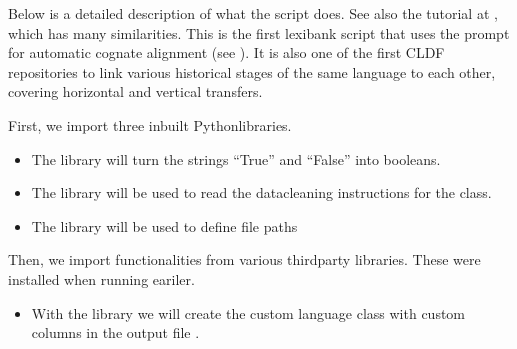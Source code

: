 \documentclass[letterpaper,10pt,english]{sphinxmanual}
\begin{document}
{{{{\sphinxAtStartPar
Below is a detailed description of what the script does. See also the
tutorial at , which has many similarities.
This is the first lexibank script that uses the
 prompt for automatic cognate alignment
(see ).
It is also one of the first CLDF repositories to link various historical
stages of the same language to each other, covering horizontal and vertical
transfers.

\begin{sphinxVerbatim}[commandchars=\\\{\}]
 
 
 

 
   
   
       
\end{sphinxVerbatim}

\sphinxAtStartPar
First, we import three inbuilt Python\sphinxhyphen{}libraries.
\begin{itemize}
\item {} 
\sphinxAtStartPar
The  library will turn
the strings “True” and “False” into booleans.

\item {} 
\sphinxAtStartPar
The  library
will be used to read the data\sphinxhyphen{}cleaning instructions for the
 class.

\item {} 
\sphinxAtStartPar
The  library
will be used to define file paths

\end{itemize}

\sphinxAtStartPar
Then, we import functionalities from various third\sphinxhyphen{}party libraries.
These were installed when running
 eariler.
\begin{itemize}
\item {} 
\sphinxAtStartPar
With the  library
we will create the custom language class with custom columns in the output
file .


\end{itemize}}}}}
\end{document}
